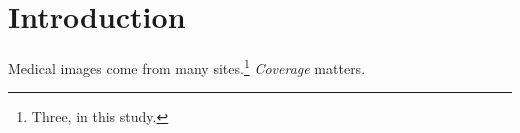 \section{Introduction}
Medical images come from many sites.\footnote{Three, in this study.}
\textit{Coverage} matters.
